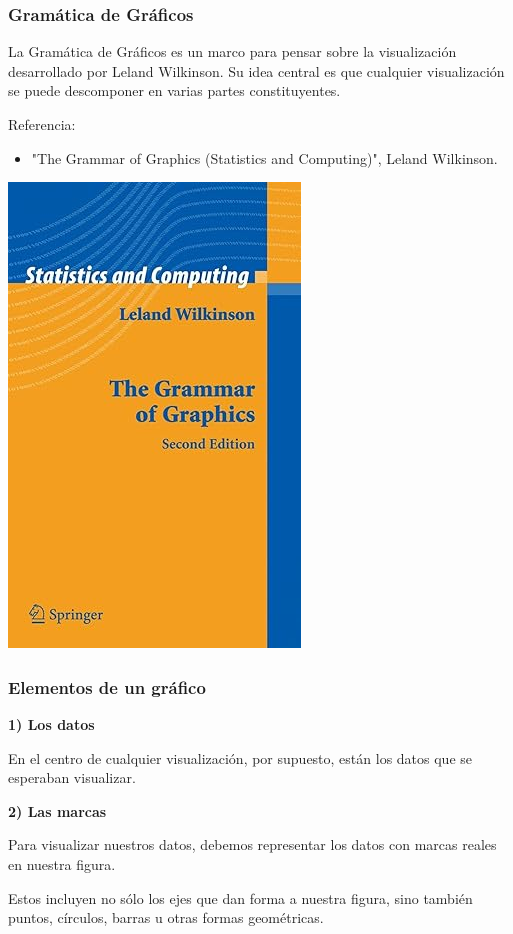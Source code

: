 \documentclass[aspectratio=169,12pt]{beamer}
\begin{document}
\begin{frame}
\frametitle{Gramática de Gráficos}

\begin{minipage}{.55\textwidth}
La Gramática de Gráficos es un marco para pensar sobre la visualización desarrollado por Leland Wilkinson. Su idea central es que cualquier visualización se puede descomponer en varias partes constituyentes.

\vspace{0.5cm}

Referencia:
\begin{itemize}
\item "The Grammar of Graphics (Statistics and Computing)", Leland Wilkinson. 
\end{itemize}
\end{minipage} %
\begin{minipage}{.4\textwidth}
\begin{center}
\includegraphics[scale=0.35]{TheGrammarOfGraphics.jpg}
\end{center}
\end{minipage}

\end{frame}


\begin{frame}
\frametitle{Elementos de un gráfico}

\textbf{1) Los datos}

En el centro de cualquier visualización, por supuesto, están los datos que se esperaban visualizar.

\textbf{2) Las marcas}

Para visualizar nuestros datos, debemos representar los datos con marcas reales en nuestra figura. 

Estos incluyen no sólo los ejes que dan forma a nuestra figura, sino también puntos, círculos, barras u otras formas geométricas.

\end{frame}
\end{document}
